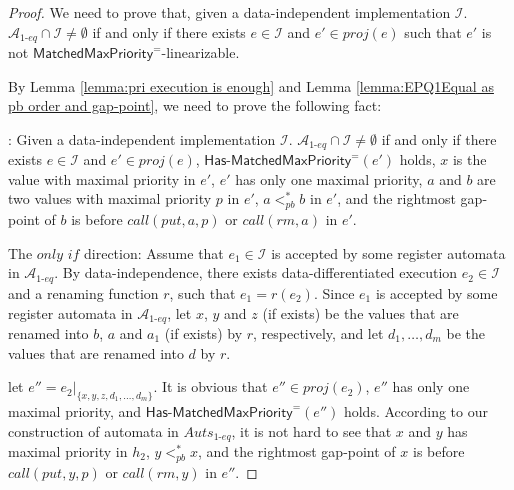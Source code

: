 \begin {proof}

We need to prove that, given a data-independent implementation $\mathcal{I}$. $\mathcal{A}_{\textit{1-eq}} \cap \mathcal{I} \neq \emptyset$ if and only if there exists $e \in \mathcal{I}$ and $e' \in \textit{proj}(e)$ such that $e'$ is not $\mathsf{MatchedMaxPriority}^{=}$-linearizable.

By Lemma \ref{lemma:pri execution is enough} and Lemma \ref{lemma:EPQ1Equal as pb order and gap-point}, we need to prove the following fact:

: Given a data-independent implementation $\mathcal{I}$. $\mathcal{A}_{\textit{1-eq}} \cap \mathcal{I} \neq \emptyset$ if and only if there exists $e \in \mathcal{I}$ and $e' \in \textit{proj}(e)$, $\mathsf{Has\text{-}MatchedMaxPriority}^{=}(e')$ holds, $x$ is the value with maximal priority in $e'$, $e'$ has only one maximal priority, $a$ and $b$ are two values with maximal priority $p$ in $e'$, $a <_{\textit{pb}}^* b$ in $e'$, and the rightmost gap-point of $b$ is before $\textit{call}(\textit{put},a,p)$ or $\textit{call}(\textit{rm},a)$ in $e'$.

\noindent The $\textit{only if}$ direction: Assume that $e_1 \in \mathcal{I}$ is accepted by some register automata in $\mathcal{A}_{\textit{1-eq}}$. By data-independence, there exists data-differentiated execution $e_2 \in \mathcal{I}$ and a renaming function $r$, such that $e_1=r(e_2)$. Since $e_1$ is accepted by some register automata in  $\mathcal{A}_{\textit{1-eq}}$, let $x$, $y$ and $z$ (if exists) be the values that are renamed into $b$, $a$ and $a_1$ (if exists) by $r$, respectively, and let $d_1,\ldots,d_m$ be the values that are renamed into $d$ by $r$.

let $e'' = e_2 \vert_{ \{ x,y,z,d_1,\ldots,d_m \} }$. It is obvious that $e'' \in \textit{proj}(e_2)$, $e''$ has only one maximal priority, and $\mathsf{Has\text{-}MatchedMaxPriority}^{=}(e'')$ holds. According to our construction of automata in $\textit{Auts}_{\textit{1-eq}}$, it is not hard to see that $x$ and $y$ has maximal priority in $h_2$, $y <_{\textit{pb}}^* x$, and the rightmost gap-point of $x$ is before $\textit{call}(\textit{put},y,p)$ or $\textit{call}(\textit{rm},y)$ in $e''$.


\end{proof}
